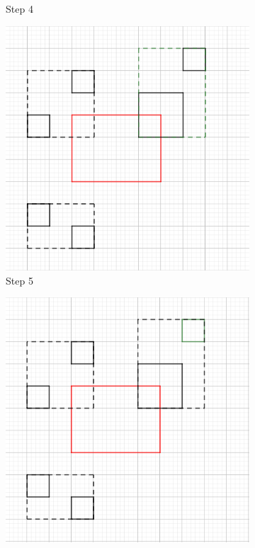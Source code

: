 \documentclass{article}
\begin{document}
\begin{figure}[h]
\begin{subfigure}{0.3\textwidth}
    \caption{Step 4}
    \centering
    \end{subfigure}
    \begin{subfigure}{0.3\textwidth}
    \includegraphics[width=\textwidth]{search/5.png}
    \caption{Step 5}
    \centering
    \end{subfigure}
    \begin{subfigure}{0.3\textwidth}
    \includegraphics[width=\textwidth]{search/6.png}

\end{subfigure}
\end{figure}
\end{document}
